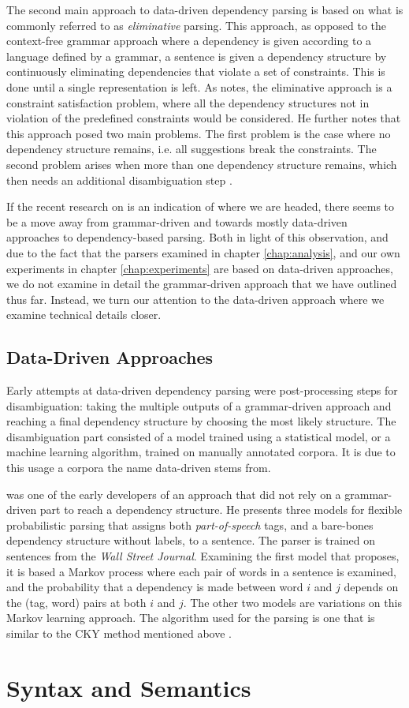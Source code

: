 The second main approach to data-driven dependency parsing is based on what is commonly referred to as \textit{eliminative} parsing. This approach, as opposed to the context-free grammar approach where a dependency is given according to a language defined by a grammar, a sentence is given a dependency structure by continuously eliminating dependencies that violate a set of constraints. This is done until a single representation is left. As \citeauthor{Niv:05} notes, the eliminative approach is a constraint satisfaction problem, where all the dependency structures not in violation of the predefined constraints would be considered. He further notes that this approach posed two main problems. The first problem is the case where no dependency structure remains, i.e. all suggestions break the constraints. The second problem arises when more than one dependency structure remains, which then needs an additional disambiguation step \cite{Niv:05}.

If the recent research on is an indication of where we are headed, there seems to be a move away from grammar-driven and towards mostly data-driven approaches to dependency-based parsing. Both in light of this observation, and due to the fact that the parsers examined in chapter \ref{chap:analysis}, and our own experiments in chapter \ref{chap:experiments} are based on data-driven approaches, we do not examine in detail the grammar-driven approach that we have outlined thus far. Instead, we turn our attention to the data-driven approach where we examine technical details closer.

\subsection{Data-Driven Approaches}
\label{data-driven}

Early attempts at data-driven dependency parsing were post-processing steps for disambiguation: taking the multiple outputs of a grammar-driven approach and reaching a final dependency structure by choosing the most likely structure. The disambiguation part consisted of a model trained using a statistical model, or a machine learning algorithm, trained on manually annotated corpora. It is due to this usage a corpora the name data-driven stems from.


\citeauthor{Eisner:96a} was one of the early developers of an approach that did not rely on a grammar-driven part to reach a dependency structure. He presents three models for flexible probabilistic parsing that assigns both \textit{part-of-speech} tags, and a bare-bones dependency structure without labels, to a sentence. The parser is trained on sentences from the \textit{Wall Street Journal}. Examining the first model that \citeauthor{Eisner:96a} proposes, it is based a Markov process where each pair of words in a sentence is examined, and the probability that a dependency is made between word $i$ and $j$ depends on the (tag, word) pairs at both $i$ and $j$. The other two models are variations on this Markov learning approach. The algorithm used for the parsing is one that is similar to the CKY method mentioned above \cite{Eisner:96a}.




\section{Syntax and Semantics}
\label{syntactic-semantic}